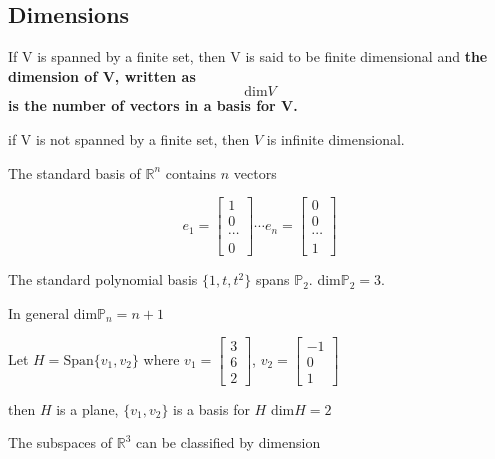 \subsection{Dimensions}
If V is spanned by a finite set, then V is said to be finite dimensional and \textbf{
the dimension of V, written as 
\begin{equation}
	\label{}
	\mbox{dim} V
\end{equation}
is the number of vectors in a basis for V.
} 

if V is not spanned by a finite set, then $V$ is infinite dimensional.


\hfill


The standard basis of $\mathbb{R}^{n}$ contains $n$ vectors

\begin{equation}
	\label{}
e_{1}=	
	\begin{bmatrix}
	1\\
	0\\
	\cdots\\
	0
	\end{bmatrix}
\cdots
e_{n}=
\begin{bmatrix}
0\\
0\\
\cdots\\
1
\end{bmatrix}
\end{equation}

 
The standard polynomial basis $\{1,t,t^{2}\}$ spans $\mathbb{P}_{2}$. \mbox{dim}$\mathbb{P}_{2}=3$. 

In general dim$\mathbb{P}_{n}=n+1$

Let $H=\mbox{Span}\{v_{1},v_{2}\}$ where $v_{1}=
\begin{bmatrix}
	3\\ 6\\ 2
\end{bmatrix}
$, $v_{2}=
\begin{bmatrix}
-1\\ 0\\ 1	
\end{bmatrix}
$

then $H$ is a plane, $\{v_{1},v_{2}\}$ is a basis for $H$ dim$H=2$


The subspaces of $\mathbb{R}^{3}$ can be classified by dimension


